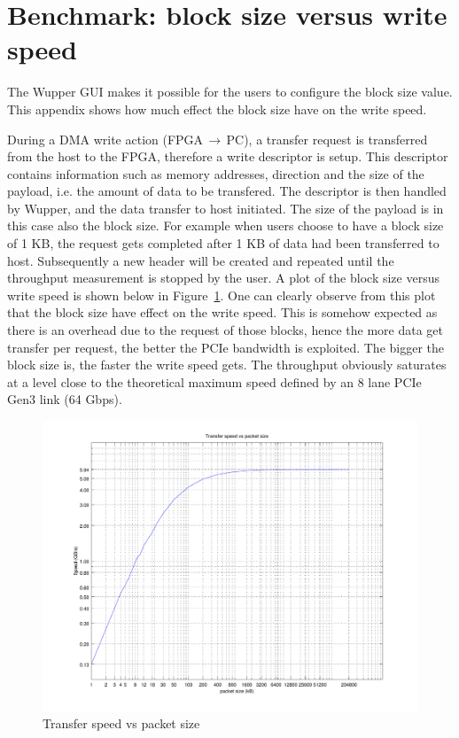 \section{Benchmark: block size versus write speed}
\label{sec:blocksize}
The Wupper GUI makes it possible for the users to configure the block size value. This appendix shows how much effect the block size have on the write speed. 

During a DMA write action (FPGA$\,\to\,$PC), a transfer request is transferred from the host to the FPGA, therefore a write descriptor is setup. This descriptor contains information such as memory addresses, direction and the size of the payload, i.e. the amount of data to be transfered. The descriptor is then handled by Wupper, and the data transfer to host initiated. The size of the payload is in this case also the block size. For example when users choose to have a block size of 1 KB, the request gets completed after 1 KB of data had been transferred to host. Subsequently a new header will be created and repeated until the throughput measurement is stopped by the user. 
A plot of the block size versus write speed is shown below in Figure~\ref{fig:blocksizeplot}. One can clearly observe from this plot that the block size have effect on the write speed. This is somehow expected as there is an overhead due to the request of those blocks, hence the more data get transfer per request, the better the PCIe bandwidth is exploited. The bigger the block size is, the faster the write speed gets. The throughput obviously saturates at a level close to the theoretical maximum speed defined by an 8 lane PCIe Gen3 link (64 Gbps).

\begin{figure}[h]
	
	\centering
	\includegraphics[width = 1 \textwidth]{figures/blocksize_plot.pdf}	
	\caption{Transfer speed vs packet size}
	\label{fig:blocksizeplot}
\end{figure}